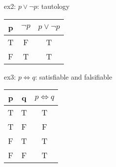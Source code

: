 \documentclass{article}
\begin{document}
ex2: $p \lor \lnot p$: tautology
\begin{table}[h!]
    \begin{center}
        \begin{tabular}{|c|c|c|}
            \hline
            p & $\lnot p$ & $p \lor \lnot p$ \\
            \hline\hline
            T & F         & T                \\
            F & T         & T                \\
            \hline
        \end{tabular}
    \end{center}
\end{table}

ex3: $p \iff q$: satisfiable and falsifiable
\begin{table}[h!]
    \begin{center}
        \begin{tabular}{|c|c|c|}
            \hline
            p & q & $p \iff q$ \\
            \hline\hline
            T & T & T          \\
            T & F & F          \\
            F & T & T          \\
            F & F & T          \\
            \hline
        \end{tabular}
    \end{center}
\end{table}
\end{document}
